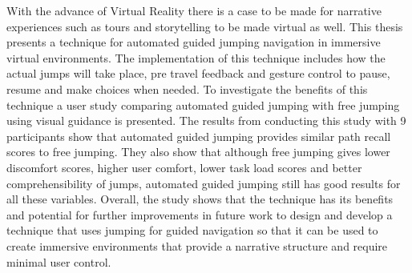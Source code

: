 \label{Abstract}
With the advance of Virtual Reality there is a case to be made for narrative experiences such as tours and storytelling to be made virtual as well. This thesis presents a technique for automated guided jumping navigation in immersive virtual environments. The implementation of this technique includes how the actual jumps will take place, pre travel feedback and gesture control to pause, resume and make choices when needed. To investigate the benefits of this technique a user study comparing automated guided jumping with free jumping using visual guidance is presented. The results from conducting this study with 9 participants show that automated guided jumping provides similar path recall scores to free jumping. They also show that although free jumping gives lower discomfort scores, higher user comfort, lower task load scores and better comprehensibility of jumps, automated guided jumping still has good results for all these variables. Overall, the study shows that the technique has its benefits and potential for further improvements in future work to design and develop a technique that uses jumping for guided navigation so that it can be used to create immersive environments that provide a narrative structure and require minimal user control.